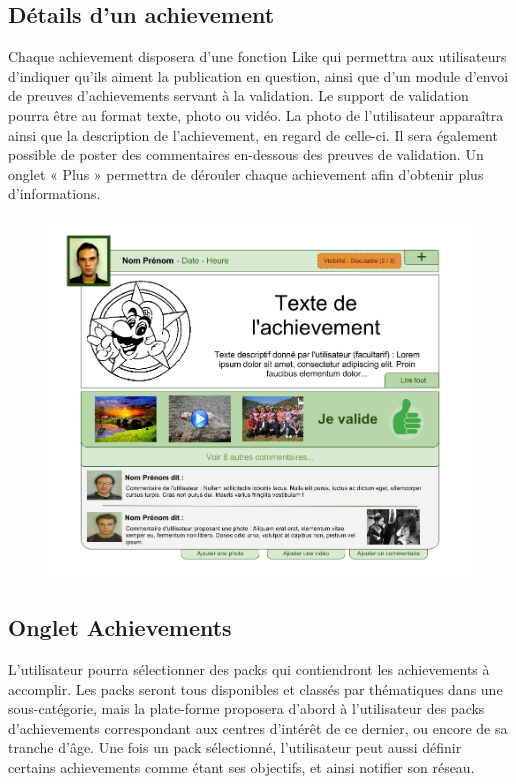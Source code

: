 \documentclass{life-fr}
\begin{document}
\subsection{Détails d'un achievement}

Chaque achievement disposera d'une fonction Like qui permettra aux utilisateurs d'indiquer qu'ils aiment la publication en question, ainsi que d'un module d'envoi de preuves d'achievements servant à la validation. Le support de validation pourra être au format texte, photo ou vidéo. La photo de l'utilisateur apparaîtra ainsi que la description de l'achievement, en regard de celle-ci. Il sera également possible de poster des commentaires en-dessous des preuves de validation. Un onglet « Plus » permettra de dérouler chaque achievement afin d'obtenir plus d'informations.\\

\begin{figure}[H]
  \begin{center}
    \includegraphics[width=15cm]{img/achievement.png}
  \end{center}
\end{figure}

\subsection{Onglet Achievements}

L'utilisateur pourra sélectionner des packs qui contiendront les achievements à accomplir. Les packs seront tous disponibles et classés par thématiques dans une sous-catégorie, mais la plate-forme proposera d'abord à l'utilisateur des packs d'achievements correspondant aux centres d'intérêt de ce dernier, ou encore de sa tranche d'âge. Une fois un pack sélectionné, l'utilisateur peut aussi définir certains achievements comme étant ses objectifs, et ainsi notifier son réseau.
\end{document}
